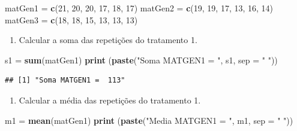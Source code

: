 \documentclass[
]{article}
\newenvironment{Shaded}{\begin{snugshade}}{\end{snugshade}}
\newcommand{\DataTypeTok}[1]{\textcolor[rgb]{0.13,0.29,0.53}{#1}}
\newcommand{\DecValTok}[1]{\textcolor[rgb]{0.00,0.00,0.81}{#1}}
\newcommand{\KeywordTok}[1]{\textcolor[rgb]{0.13,0.29,0.53}{\textbf{#1}}}
\newcommand{\NormalTok}[1]{#1}
\newcommand{\StringTok}[1]{\textcolor[rgb]{0.31,0.60,0.02}{#1}}
\providecommand{\tightlist}{%
  \setlength{\itemsep}{0pt}\setlength{\parskip}{0pt}}
\begin{document}
\begin{Shaded}
\begin{Highlighting}[]
\NormalTok{matGen1 =}\StringTok{ }\KeywordTok{c}\NormalTok{(}\DecValTok{21}\NormalTok{, }\DecValTok{20}\NormalTok{, }\DecValTok{20}\NormalTok{, }\DecValTok{17}\NormalTok{, }\DecValTok{18}\NormalTok{, }\DecValTok{17}\NormalTok{)}
\NormalTok{matGen2 =}\StringTok{ }\KeywordTok{c}\NormalTok{(}\DecValTok{19}\NormalTok{, }\DecValTok{19}\NormalTok{, }\DecValTok{17}\NormalTok{, }\DecValTok{13}\NormalTok{, }\DecValTok{16}\NormalTok{, }\DecValTok{14}\NormalTok{)}
\NormalTok{matGen3 =}\StringTok{ }\KeywordTok{c}\NormalTok{(}\DecValTok{18}\NormalTok{, }\DecValTok{18}\NormalTok{, }\DecValTok{15}\NormalTok{, }\DecValTok{13}\NormalTok{, }\DecValTok{13}\NormalTok{, }\DecValTok{13}\NormalTok{)}
\end{Highlighting}
\end{Shaded}

\begin{enumerate}
\def\labelenumi{\arabic{enumi}.}
\setcounter{enumi}{1}
\tightlist
\item
  Calcular a soma das repetições do tratamento 1.
\end{enumerate}

\begin{Shaded}
\begin{Highlighting}[]
\NormalTok{s1 =}\StringTok{ }\KeywordTok{sum}\NormalTok{(matGen1)}
\KeywordTok{print}\NormalTok{ (}\KeywordTok{paste}\NormalTok{(}\StringTok{"Soma MATGEN1 = "}\NormalTok{, s1, }\DataTypeTok{sep =} \StringTok{" "}\NormalTok{))}
\end{Highlighting}
\end{Shaded}

\begin{verbatim}
## [1] "Soma MATGEN1 =  113"
\end{verbatim}

\begin{enumerate}
\def\labelenumi{\arabic{enumi}.}
\setcounter{enumi}{2}
\tightlist
\item
  Calcular a média das repetições do tratamento 1.
\end{enumerate}

\begin{Shaded}
\begin{Highlighting}[]
\NormalTok{m1 =}\StringTok{ }\KeywordTok{mean}\NormalTok{(matGen1)}
\KeywordTok{print}\NormalTok{ (}\KeywordTok{paste}\NormalTok{(}\StringTok{"Media MATGEN1 = "}\NormalTok{, m1, }\DataTypeTok{sep =} \StringTok{" "}\NormalTok{))}
\end{Highlighting}
\end{Shaded}
\end{document}
